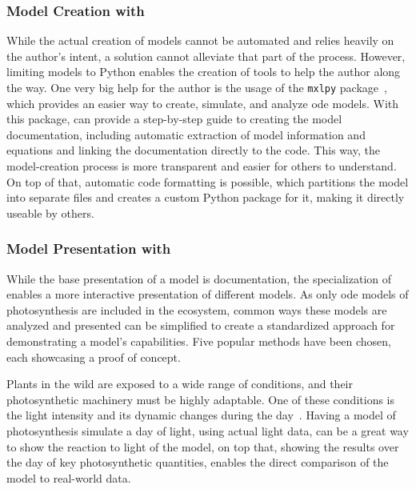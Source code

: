 \subsubsection{Model Creation with \greensloth{}}

While the actual creation of models cannot be automated and relies heavily on the author's intent, a solution cannot alleviate that part of the process. However, limiting models to Python enables the creation of tools to help the author along the way. One very big help for the author is the usage of the \verb|mxlpy| package~\cite{vanaalstMxlPyPythonPackage2025}, which provides an easier way to create, simulate, and analyze \gls{ode} models. With this package, \greensloth{} can provide a step-by-step guide to creating the model documentation, including automatic extraction of model information and equations and linking the documentation directly to the code. This way, the model-creation process is more transparent and easier for others to understand. On top of that, automatic code formatting is possible, which partitions the model into separate files and creates a custom Python package for it, making it directly useable by others.

\subsubsection{Model Presentation with \greensloth{}}

While the base presentation of a model is documentation, the specialization of \greensloth{} enables a more interactive presentation of different models. As only \gls{ode} models of photosynthesis are included in the \greensloth{} ecosystem, common ways these models are analyzed and presented can be simplified to create a standardized approach for demonstrating a model's capabilities. Five popular methods have been chosen, each showcasing a proof of concept.

Plants in the wild are exposed to a wide range of conditions, and their photosynthetic machinery must be highly adaptable. One of these conditions is the light intensity and its dynamic changes during the day~\cite{perez-penaPortableWholeCanopy2015,koehnDiurnalPatternsChlorophyll1999,amoros-lopezStudyDiurnalCycle2006}. Having a model of photosynthesis simulate a day of light, using actual light data, can be a great way to show the reaction to light of the model, on top that, showing the results over the day of key photosynthetic quantities, enables the direct comparison of the model to real-world data.

